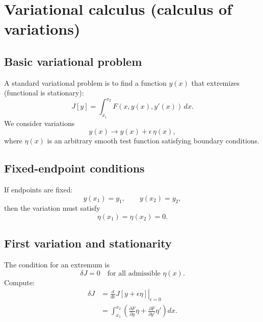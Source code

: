 
\section{Variational calculus (calculus of variations)}

\subsection{Basic variational problem}
A standard variational problem is to find a function $y(x)$ that extremizes
(functional is stationary):
\begin{equation}
J[y] = \int_{x_1}^{x_2} F(x, y(x), y'(x))\,dx.
\end{equation}
We consider variations
\begin{equation}
y(x)\to y(x)+\epsilon\,\eta(x),
\end{equation}
where $\eta(x)$ is an arbitrary smooth test function satisfying boundary conditions.

\subsection{Fixed-endpoint conditions}
If endpoints are fixed:
\begin{equation}
y(x_1)=y_1,\qquad y(x_2)=y_2,
\end{equation}
then the variation must satisfy
\begin{equation}
\eta(x_1)=\eta(x_2)=0.
\end{equation}

\subsection{First variation and stationarity}
The condition for an extremum is
\begin{equation}
\delta J = 0
\quad \text{for all admissible }\eta(x).
\end{equation}
Compute:
\begin{align}
\delta J
&= \left.\frac{d}{d\epsilon}J[y+\epsilon\eta]\right|_{\epsilon=0}\\
&= \int_{x_1}^{x_2}
\left(
\frac{\partial F}{\partial y}\eta
+
\frac{\partial F}{\partial y'}\eta'
\right)dx.
\end{align}

